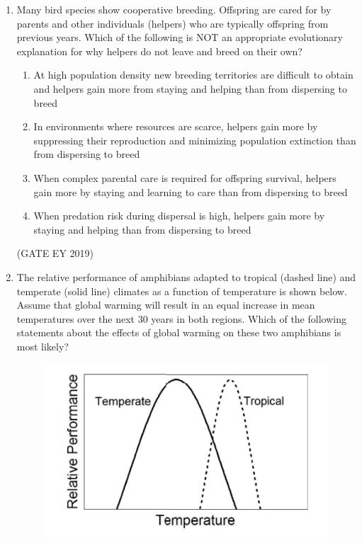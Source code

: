 \documentclass[journal,12pt,onecolumn]{IEEEtran}
\theoremstyle{remark}
\begin{document}
\begin{enumerate}
\begin{multicols}{2}
\begin{enumerate}
\item Evolution of resistance is neutral
\item Snakes in Area 2 are more adapted than the others
\item Snakes in Area 3 are less adapted than the others
\item The resistance mechanism is costly
\end{enumerate}
\end{multicols}
\hfill{(GATE EY 2019)}
\item Many bird species show cooperative breeding. Offspring are cared for by parents and other individuals (helpers) who are typically offspring from previous years. Which of the following is NOT an appropriate evolutionary explanation for why helpers do not leave and breed on their own?

\begin{enumerate}
\item At high population density new breeding territories are difficult to obtain and helpers gain more from staying and helping than from dispersing to breed
\item In environments where resources are scarce, helpers gain more by suppressing their reproduction and minimizing population extinction than from dispersing to breed
\item When complex parental care is required for offspring survival, helpers gain more by staying and learning to care than from dispersing to breed
\item When predation risk during dispersal is high, helpers gain more by staying and helping than from dispersing to breed
\end{enumerate}


\hfill{(GATE EY 2019)}


\item The relative performance of amphibians adapted to tropical (dashed line) and temperate (solid line) climates as a function of temperature is shown below. Assume that global warming will result in an equal increase in mean temperatures over the next 30 years in both regions. Which of the following statements about the effects of global warming on these two amphibians is most likely?
\begin{figure}[H]
    \centering
    \includegraphics[]{figs/37.png}
\end{figure}


\end{enumerate}
\end{document}
